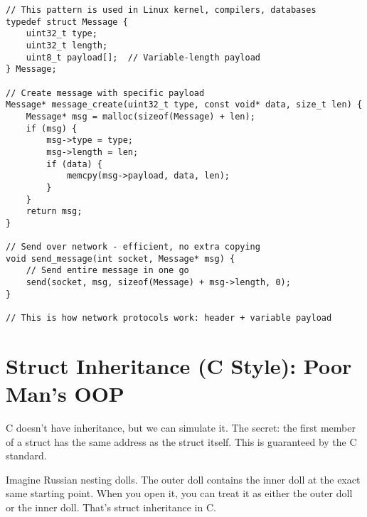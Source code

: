 \begin{lstlisting}
// This pattern is used in Linux kernel, compilers, databases
typedef struct Message {
    uint32_t type;
    uint32_t length;
    uint8_t payload[];  // Variable-length payload
} Message;

// Create message with specific payload
Message* message_create(uint32_t type, const void* data, size_t len) {
    Message* msg = malloc(sizeof(Message) + len);
    if (msg) {
        msg->type = type;
        msg->length = len;
        if (data) {
            memcpy(msg->payload, data, len);
        }
    }
    return msg;
}

// Send over network - efficient, no extra copying
void send_message(int socket, Message* msg) {
    // Send entire message in one go
    send(socket, msg, sizeof(Message) + msg->length, 0);
}

// This is how network protocols work: header + variable payload
\end{lstlisting}

\section{Struct Inheritance (C Style): Poor Man's OOP}

C doesn't have inheritance, but we can simulate it. The secret: the first member of a struct has the same address as the struct itself. This is guaranteed by the C standard.

Imagine Russian nesting dolls. The outer doll contains the inner doll at the exact same starting point. When you open it, you can treat it as either the outer doll or the inner doll. That's struct inheritance in C.

